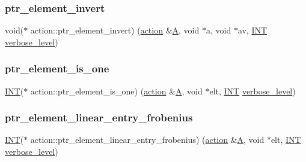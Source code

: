 \subsubsection{\texorpdfstring{ptr\+\_\+element\+\_\+invert}{ptr\_element\_invert}}
{\footnotesize\ttfamily void($\ast$ action\+::ptr\+\_\+element\+\_\+invert) (\mbox{\hyperlink{classaction}{action}} \&\mbox{\hyperlink{simeon_8_c_a97833f04c3a9c008df5521a2fc291bb4}{A}}, void $\ast$a, void $\ast$av, \mbox{\hyperlink{galois_8h_a09fddde158a3a20bd2dcadb609de11dc}{I\+NT}} \mbox{\hyperlink{simeon_8_c_a818073fbcc2f439e7c56952f67386122}{verbose\+\_\+level}})}

\mbox{\label{classaction_abe4945b2c53eef4a584c5f8f619dea73}} 
\subsubsection{\texorpdfstring{ptr\+\_\+element\+\_\+is\+\_\+one}{ptr\_element\_is\_one}}
{\footnotesize\ttfamily \mbox{\hyperlink{galois_8h_a09fddde158a3a20bd2dcadb609de11dc}{I\+NT}}($\ast$ action\+::ptr\+\_\+element\+\_\+is\+\_\+one) (\mbox{\hyperlink{classaction}{action}} \&\mbox{\hyperlink{simeon_8_c_a97833f04c3a9c008df5521a2fc291bb4}{A}}, void $\ast$elt, \mbox{\hyperlink{galois_8h_a09fddde158a3a20bd2dcadb609de11dc}{I\+NT}} \mbox{\hyperlink{simeon_8_c_a818073fbcc2f439e7c56952f67386122}{verbose\+\_\+level}})}

\mbox{\label{classaction_a354207d6df46f76b93e8c2b5ec8f860d}} 
\subsubsection{\texorpdfstring{ptr\+\_\+element\+\_\+linear\+\_\+entry\+\_\+frobenius}{ptr\_element\_linear\_entry\_frobenius}}
{\footnotesize\ttfamily \mbox{\hyperlink{galois_8h_a09fddde158a3a20bd2dcadb609de11dc}{I\+NT}}($\ast$ action\+::ptr\+\_\+element\+\_\+linear\+\_\+entry\+\_\+frobenius) (\mbox{\hyperlink{classaction}{action}} \&\mbox{\hyperlink{simeon_8_c_a97833f04c3a9c008df5521a2fc291bb4}{A}}, void $\ast$elt, \mbox{\hyperlink{galois_8h_a09fddde158a3a20bd2dcadb609de11dc}{I\+NT}} \mbox{\hyperlink{simeon_8_c_a818073fbcc2f439e7c56952f67386122}{verbose\+\_\+level}})}

